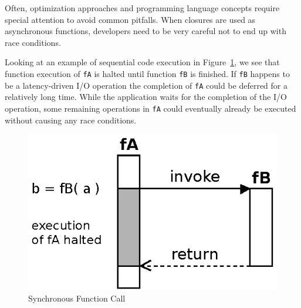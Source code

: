 
Often, optimization approaches and programming language concepts require special attention to avoid common pitfalls.
When closures are used as asynchronous functions, developers need to be very careful not to end up with race conditions.


Looking at an example of sequential code execution in Figure~\ref{fig:Closures_Synchronous}, we see that function execution of \texttt{fA} is halted until function \texttt{fB} is finished.
If \texttt{fB} happens to be a latency-driven I/O operation the completion of \texttt{fA} could be deferred for a relatively long time.
While the application waits for the completion of the I/O operation, some remaining operations in \texttt{fA} could eventually already be executed without causing any race conditions.
\begin{figure}[h!]
	\centering
  \includegraphics{figures/Closures_Synchronous}
	\caption{Synchronous Function Call}
	\label{fig:Closures_Synchronous}
\end{figure}


